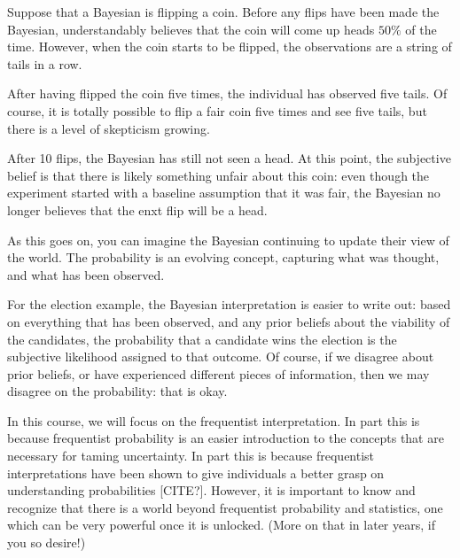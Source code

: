 \documentclass[
  letterpaper,
  DIV=11,
  numbers=noendperiod]{scrreprt}
\begin{document}
\begin{tcolorbox}[enhanced jigsaw, toptitle=1mm, arc=.35mm, title=\textcolor{quarto-callout-note-color}{\faInfo}\hspace{0.5em}{Bayesian Probabilities and Belief Updating}, opacitybacktitle=0.6, colbacktitle=quarto-callout-note-color!10!white, coltitle=black, breakable, bottomrule=.15mm, opacityback=0, colframe=quarto-callout-note-color-frame, bottomtitle=1mm, titlerule=0mm, rightrule=.15mm, toprule=.15mm, left=2mm, leftrule=.75mm, colback=white]

Suppose that a Bayesian is flipping a coin. Before any flips have been
made the Bayesian, understandably believes that the coin will come up
heads \(50\%\) of the time. However, when the coin starts to be flipped,
the observations are a string of tails in a row.

After having flipped the coin five times, the individual has observed
five tails. Of course, it is totally possible to flip a fair coin five
times and see five tails, but there is a level of skepticism growing.

After 10 flips, the Bayesian has still not seen a head. At this point,
the subjective belief is that there is likely something unfair about
this coin: even though the experiment started with a baseline assumption
that it was fair, the Bayesian no longer believes that the enxt flip
will be a head.

As this goes on, you can imagine the Bayesian continuing to update their
view of the world. The probability is an evolving concept, capturing
what was thought, and what has been observed.

\end{tcolorbox}

For the election example, the Bayesian interpretation is easier to write
out: based on everything that has been observed, and any prior beliefs
about the viability of the candidates, the probability that a candidate
wins the election is the subjective likelihood assigned to that outcome.
Of course, if we disagree about prior beliefs, or have experienced
different pieces of information, then we may disagree on the
probability: that is okay.

In this course, we will focus on the frequentist interpretation. In part
this is because frequentist probability is an easier introduction to the
concepts that are necessary for taming uncertainty. In part this is
because frequentist interpretations have been shown to give individuals
a better grasp on understanding probabilities {[}CITE?{]}. However, it
is important to know and recognize that there is a world beyond
frequentist probability and statistics, one which can be very powerful
once it is unlocked. (More on that in later years, if you so desire!)
\end{document}
